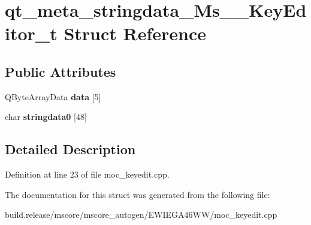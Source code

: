 \hypertarget{structqt__meta__stringdata___ms_____key_editor__t}{}\section{qt\+\_\+meta\+\_\+stringdata\+\_\+\+Ms\+\_\+\+\_\+\+Key\+Editor\+\_\+t Struct Reference}
\label{structqt__meta__stringdata___ms_____key_editor__t}
\subsection*{Public Attributes}
\begin{DoxyCompactItemize}
\item 
\mbox{\label{structqt__meta__stringdata___ms_____key_editor__t_ab972b282e80d3b036aea04e6ac86108a}} 
Q\+Byte\+Array\+Data {\bfseries data} \mbox{[}5\mbox{]}
\item 
\mbox{\label{structqt__meta__stringdata___ms_____key_editor__t_a3f64ba78fa244c71641045ef721563b2}} 
char {\bfseries stringdata0} \mbox{[}48\mbox{]}
\end{DoxyCompactItemize}


\subsection{Detailed Description}


Definition at line 23 of file moc\+\_\+keyedit.\+cpp.



The documentation for this struct was generated from the following file\+:\begin{DoxyCompactItemize}
\item 
build.\+release/mscore/mscore\+\_\+autogen/\+E\+W\+I\+E\+G\+A46\+W\+W/moc\+\_\+keyedit.\+cpp\end{DoxyCompactItemize}
